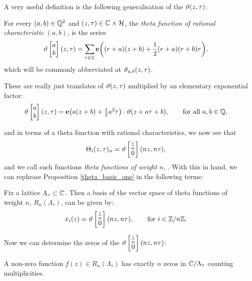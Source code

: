 A very useful definition is the following generalisation of the $\vartheta(z,\tau)$:\\

\begin{defn}
	For every $(a,b) \in \mathbb{Q}^{2}$ and $(z,\tau) \in \mathbb{C} \times \mathcal{H}$, the \emph{theta function of rational characteristic $(a,b)$}, is the series
	\begin{equation*}
		\vartheta\begin{bmatrix} a\\ b \end{bmatrix}(z,\tau) = \sum_{r\in\mathbb{Z}}\mathbf{e}\bigg((r + a)(z + b) + \frac{1}{2}(r+a)(r+b)\tau \bigg),
	\end{equation*}
	which will be commonly abbreviated at $\vartheta_{a,b}(z,\tau)$.
\end{defn}

These are really just translates of $\vartheta(z,\tau)$ multiplied by an elementary exponential factor:
\begin{equation*}
	\vartheta\begin{bmatrix} a\\ b \end{bmatrix}(z,\tau) = \mathbf{e}\big(a(z+b) + \tfrac{1}{2}a^{2}\tau\big)\cdot\vartheta(z + a\tau + b),\qquad\text{for all } a,b \in \mathbb{Q},
\end{equation*}

and in terms of a theta function with rational characteristics, we now see that
\begin{equation}
\label{theta_weight_n}
	\Theta_{i}(z,\tau)_{n} = \vartheta\begin{bmatrix} \frac{i}{n}\\ 0 \end{bmatrix}(nz,n\tau),
\end{equation}
and we call such functions \emph{theta functions of weight $n$}, \cite{Mumford_1983}. With this in hand, we can rephrase Proposition \ref{theta_basis_one} in the following terms:\\

\begin{prop}
	\label{theta_basis}
	Fix a lattice $\Lambda_{\tau}\subset \mathbb{C}$. Then a basis of the vector space of theta functions of weight $n$, $R_{n}(\Lambda_{\tau})$, can be given by:
	\begin{equation*}
		x_{i}(z) = \vartheta\begin{bmatrix} \tfrac{i}{n}\\ 0 \end{bmatrix}(nz,n\tau),\qquad \text{for }i \in \mathbb{Z}/n\mathbb{Z}.
	\end{equation*}
\end{prop}

Now we can determine the zeros of the $\vartheta\begin{bmatrix} \tfrac{i}{n}\\ 0 \end{bmatrix}(nz,n\tau)$:\\

\begin{prop}
	A non-zero function $f(z) \in R_{n}(\Lambda_{\tau})$ has exactly $n$ zeros in $\mathbb{C}/\Lambda_{\tau}$ counting multiplicities.
\end{prop}

